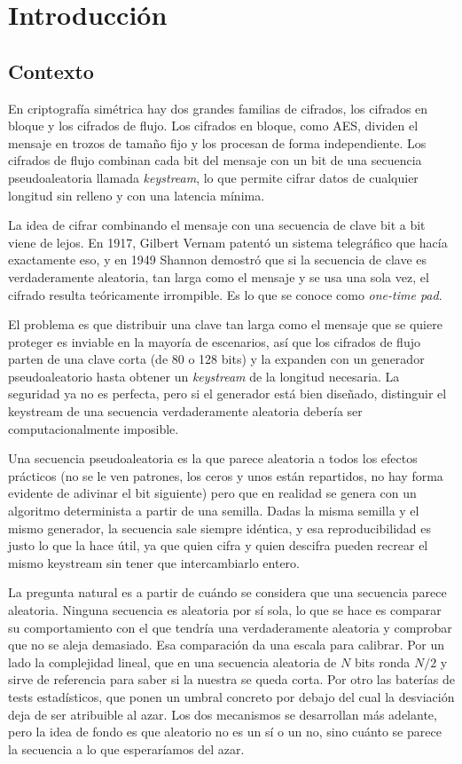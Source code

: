 \chapter{Introducción}

\section{Contexto}

En criptografía simétrica hay dos grandes familias de cifrados, los cifrados en bloque y los cifrados de flujo.
Los cifrados en bloque, como AES, dividen el mensaje en trozos de tamaño fijo y los procesan de forma independiente.
Los cifrados de flujo combinan cada bit del mensaje con un bit de una secuencia pseudoaleatoria llamada \textit{keystream},
lo que permite cifrar datos de cualquier longitud sin relleno y con una latencia mínima.

La idea de cifrar combinando el mensaje con una secuencia de clave bit a bit viene de lejos.
En 1917, Gilbert Vernam patentó un sistema telegráfico que hacía exactamente eso, y en 1949 Shannon demostró
que si la secuencia de clave es verdaderamente aleatoria, tan larga como el mensaje y se usa una sola vez,
el cifrado resulta teóricamente irrompible. Es lo que se conoce como \textit{one-time pad}.

El problema es que distribuir una clave tan larga como el mensaje que se quiere proteger es inviable en la mayoría de escenarios,
así que los cifrados de flujo parten de una clave corta (de 80 o 128 bits)
y la expanden con un generador pseudoaleatorio hasta obtener un \textit{keystream} de la longitud necesaria.
La seguridad ya no es perfecta, pero si el generador está bien diseñado, distinguir el keystream de una secuencia
verdaderamente aleatoria debería ser computacionalmente imposible.

Una secuencia pseudoaleatoria es la que parece aleatoria a todos los efectos prácticos (no se le ven patrones, los ceros y unos están repartidos,
no hay forma evidente de adivinar el bit siguiente) pero que en realidad se genera con un algoritmo determinista a partir de una semilla.
Dadas la misma semilla y el mismo generador, la secuencia sale siempre idéntica, y esa reproducibilidad es justo lo que la hace útil,
ya que quien cifra y quien descifra pueden recrear el mismo keystream sin tener que intercambiarlo entero.

La pregunta natural es a partir de cuándo se considera que una secuencia parece aleatoria.
Ninguna secuencia es aleatoria por sí sola, lo que se hace es comparar su comportamiento con el que tendría una verdaderamente aleatoria y comprobar que no se aleja demasiado.
Esa comparación da una escala para calibrar. Por un lado la complejidad lineal, que en una secuencia aleatoria de $N$ bits ronda $N/2$ y sirve de referencia para saber si la nuestra se queda corta.
Por otro las baterías de tests estadísticos, que ponen un umbral concreto por debajo del cual la desviación deja de ser atribuible al azar.
Los dos mecanismos se desarrollan más adelante, pero la idea de fondo es que aleatorio no es un sí o un no, sino cuánto se parece la secuencia a lo que esperaríamos del azar.

